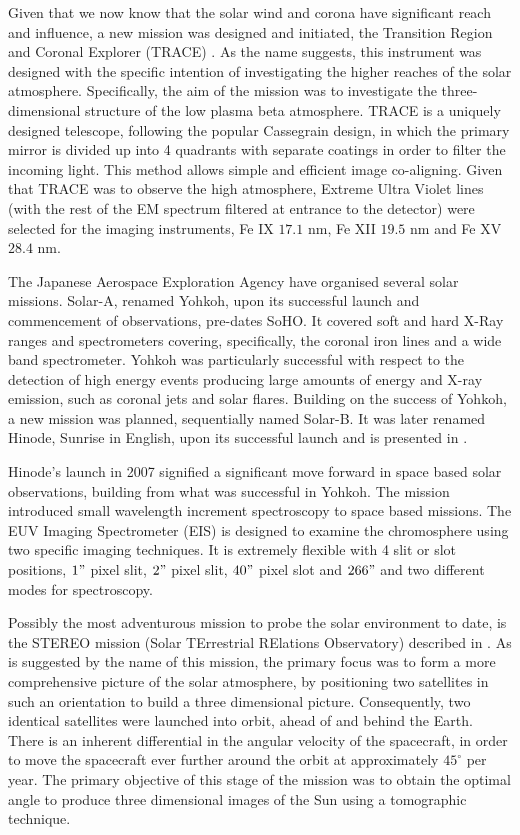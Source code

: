 Given that we now know that the solar wind and corona have significant reach and influence, a new mission was designed and initiated, the Transition Region and Coronal Explorer (TRACE) \cite{Gaeng1998}.
As the name suggests, this instrument was designed with the specific intention of investigating the higher reaches of the solar atmosphere.
Specifically, the aim of the mission was to investigate the three-dimensional structure of the low plasma beta atmosphere.
TRACE is a uniquely designed telescope, following the popular Cassegrain design, in which the primary mirror is divided up into 4 quadrants with separate coatings in order to filter the incoming light.
This method allows simple and efficient image co-aligning.
Given that TRACE was to observe the high atmosphere, Extreme Ultra Violet lines (with the rest of the EM spectrum filtered at entrance to the detector) were selected for the imaging instruments, Fe IX $17.1$ nm, Fe XII $19.5$ nm and Fe XV $28.4$ nm.




The Japanese Aerospace Exploration Agency have organised several solar missions.
Solar-A, renamed Yohkoh, \cite{Tsuneta1991} upon its successful launch and commencement of observations, pre-dates SoHO.
It covered soft and hard X-Ray ranges and spectrometers covering, specifically, the coronal iron lines and a wide band spectrometer. 
Yohkoh was particularly successful with respect to the detection of high energy events producing large amounts of energy and X-ray emission, such as coronal jets and solar flares.
Building on the success of Yohkoh, a new mission was planned, sequentially named Solar-B.
It was later renamed Hinode, Sunrise in English, upon its successful launch and is presented in \cite{Kosugi2007}.
 
Hinode's launch in 2007 signified a significant move forward in space based solar observations, building from what was successful in Yohkoh.
The mission introduced small wavelength increment spectroscopy to space based missions.
The EUV Imaging Spectrometer (EIS) is designed to examine the chromosphere using two specific imaging techniques.
It is extremely flexible with 4 slit or slot positions, $1"$ pixel slit, $2"$ pixel slit, $40"$ pixel slot and $266"$ and two different modes for spectroscopy.

Possibly the most adventurous mission to probe the solar environment to date, is the STEREO mission (Solar TErrestrial RElations Observatory) described in \cite{Kaiser2008}.
As is suggested by the name of this mission, the primary focus was to form a more comprehensive picture of the solar atmosphere, by positioning two satellites in such an orientation to build a three dimensional picture.
Consequently, two identical satellites were launched into orbit, ahead of and behind the Earth.
There is an inherent differential in the angular velocity of the spacecraft, in order to move the spacecraft ever further around the orbit at approximately $45^\circ$ per year.
The primary objective of this stage of the mission was to obtain the optimal angle to produce three dimensional images of the Sun using a tomographic technique.

